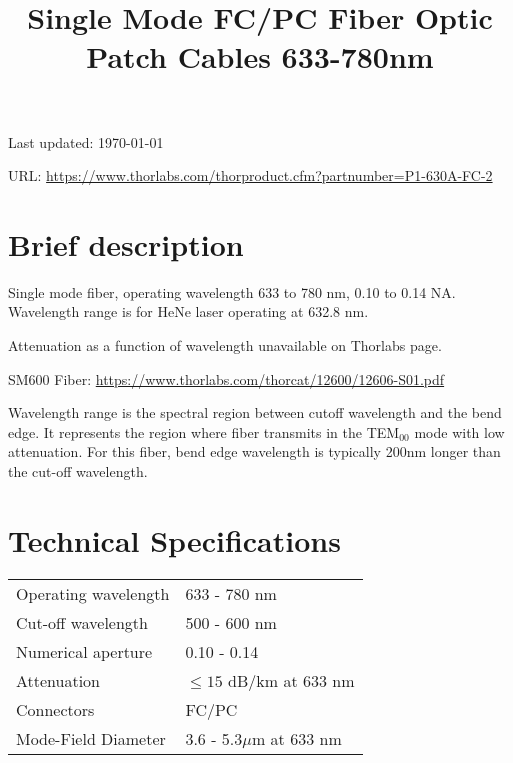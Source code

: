 \documentclass{article}
\title{\vspace{-4cm}Single Mode FC/PC Fiber Optic Patch Cables 633-780nm}
\date{}
\begin{document}
\maketitle

\vspace{-1cm}

Last updated: \today

URL: \url{https://www.thorlabs.com/thorproduct.cfm?partnumber=P1-630A-FC-2}


\begin{multicols}{2}

\section{Brief description}

Single mode fiber, operating wavelength 633 to 780 nm, 0.10 to 0.14 NA.  Wavelength range is for HeNe laser operating at 632.8 nm.

Attenuation as a function of wavelength unavailable on Thorlabs page.

SM600 Fiber: \url{https://www.thorlabs.com/thorcat/12600/12606-S01.pdf}

Wavelength range is the spectral region between cutoff wavelength and the bend edge. It represents the region where fiber transmits in the TEM$_{00}$ mode with low attenuation. For this fiber, bend edge wavelength is typically 200nm longer than the cut-off wavelength.




\section{Technical Specifications}

\begin{tabular}{|l|l|}
Operating wavelength & 633 - 780 nm \\
Cut-off wavelength & 500 - 600 nm \\
Numerical aperture & 0.10 - 0.14\\
Attenuation & $\leq 15$ dB/km at 633 nm \\
Connectors & FC/PC\\
Mode-Field Diameter & 3.6 - 5.3$\mu$m at 633 nm\\



\end{tabular}
\end{multicols}
\end{document}
